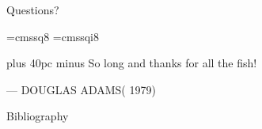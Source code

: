 \documentclass[aspectratio=169]{beamer}
\begin{document}
\begin{frame}{}
      \begin{center}
    {\color{sigma@mainblue} \LARGE Questions?}
  \end{center}
\end{frame}

\font\eightss=cmssq8
\font\eightssi=cmssqi8
\newcommand\quoteAuthorDate[3]{\begingroup
  \baselineskip 10pt
  \parfillskip 0pt
  \interlinepenalty 10000 %
  \leftskip 0pt plus 40pc minus \parindent
  \let\rm=\eightss
  \let\sl=\eightssi
  \everypar{\sl}#1\par
  \nobreak\smallskip
  \noindent\rm--- #2\unskip\enspace(#3)\par
  \endgroup}
\begin{frame}
    \begin{center}
        \item \quoteAuthorDate{So long and thanks for all the fish!}{DOUGLAS ADAMS}{\color{sigma@mainblue} 1979}
    \end{center}
\end{frame}

\nocite{intro}
\nocite{good_vids}
\begin{frame}[allowframebreaks]{Bibliography}
    \tiny
    
    
\end{frame}
\end{document}
